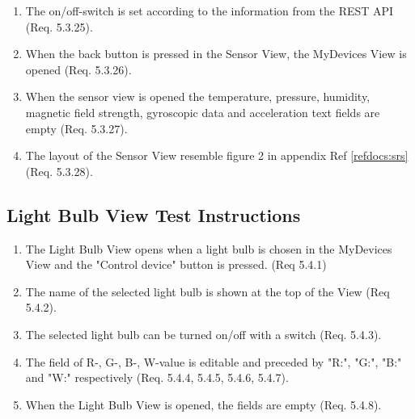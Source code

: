 \documentclass[a4paper]{article}
\newlength{\testlabellength}
\newenvironment{testlist}{\begin{enumerate}[label=\bfseries Instruction \thesubsection.\arabic* , labelindent=0pt, labelwidth=\testlabellength , leftmargin=2cm]}{\end{enumerate}}
\begin{document}
\begin{appendices}
\begin{testlist}
\begin{enumerate}
    			\end{enumerate}
    			\textbf{Postcondition:} There are text fields preceded by "T", "P", "H", "M", "G", "A".

\item The on/off-switch is set according to the information from the REST API (Req. 5.3.25).

\item When the back button is pressed in the Sensor View, the MyDevices View is opened (Req. 5.3.26).

\item When the sensor view is opened the temperature, pressure, humidity, magnetic field strength, gyroscopic data and acceleration text fields are empty (Req. 5.3.27).

\item The layout of the Sensor View resemble figure 2 in appendix  Ref \ref{refdocs:srs} (Req. 5.3.28).

\end{testlist}

\subsection{Light Bulb View Test Instructions}
\begin{testlist}
	\item The Light Bulb View opens when a light bulb is chosen in the MyDevices View and the "Control device" button is pressed. (Req 5.4.1)
	
	\item The name of the selected light bulb is shown at the top of the View (Req 5.4.2).
  
    \item The selected light bulb can be turned on/off with a switch (Req. 5.4.3). 
    
    \item The field of R-, G-, B-, W-value is editable and preceded by "R:", "G:", "B:" and "W:" respectively (Req. 5.4.4, 5.4.5, 5.4.6, 5.4.7). 
    
	\item When the Light Bulb View is opened, the fields are empty (Req. 5.4.8).


\end{testlist}
\end{appendices}
\end{document}
